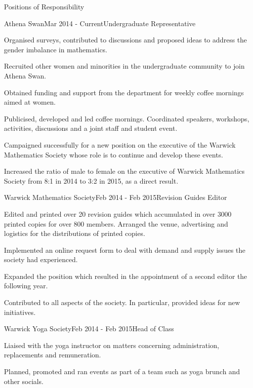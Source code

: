 \documentclass{resume} %
\begin{document}
\begin{rSection}{Positions of Responsibility}


\begin{rSubsection}{Athena Swan}{Mar 2014 - Current}{Undergraduate Representative}{}
	\item Organised surveys, contributed to discussions and proposed ideas to address the gender imbalance in mathematics. 
	\item Recruited other women and minorities in the undergraduate community to join Athena Swan. 
	\item Obtained funding and support from the department for weekly coffee mornings aimed at women. 
	\item Publicised, developed and led coffee mornings. Coordinated speakers, workshops, activities, discussions and a joint staff and student event.
	\item Campaigned successfully for a new position on the executive of the Warwick Mathematics Society whose role is to continue and develop these events. 
	\item Increased the ratio of male to female on the executive of Warwick Mathematics Society from 8:1 in 2014 to 3:2 in 2015, as a direct result.
\end{rSubsection}


\begin{rSubsection}{Warwick Mathematics Society}{Feb 2014 - Feb 2015}{Revision Guides Editor}{}
\item Edited and printed over 20 revision guides which accumulated in over 3000 printed copies for over 800 members. Arranged the venue, advertising and logistics for the distributions of printed copies. 
\item Implemented an online request form to deal with demand and supply issues the society had experienced.
\item Expanded the position which resulted in the appointment of a second editor the following year. 
\item Contributed to all aspects of the society. In particular, provided ideas for new initiatives.
\end{rSubsection}


\begin{rSubsection}{Warwick Yoga Society}{Feb 2014 - Feb 2015}{Head of Class}{}
\item Liaised with the yoga instructor on matters concerning administration, replacements and remuneration.
\item Planned, promoted and ran events as part of a team such as yoga brunch and other socials.
\end{rSubsection}

\end{rSection}
\end{document}
